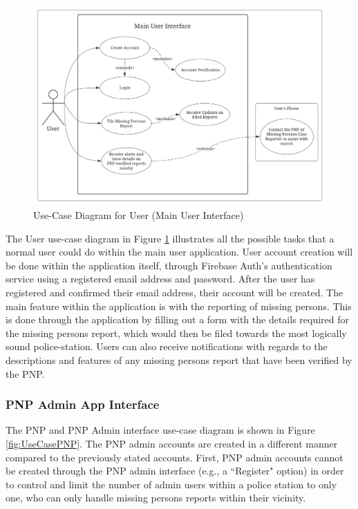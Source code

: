 \begin{figure}[!h]
    \centering
    \includegraphics[width=\textwidth]{figures/Chapter3/Chapt3_UseCase_Main.jpeg}
    \caption{Use-Case Diagram for User (Main User Interface)}
    \label{fig:UseCaseMain}
\end{figure}
The User use-case diagram in Figure \ref{fig:UseCaseMain} illustrates all the possible tasks that a normal user could do within the main user application. User account creation will be done within the application itself, through Firebase Auth’s authentication service using a registered email address and password. After the user has registered and confirmed their email address, their account will be created. The main feature within the application is with the reporting of missing persons. This is done through the application by filling out a form with the details required for the missing persons report, which would then be filed towards the most logically sound police-station. Users can also receive notifications with regards to the descriptions and features of any missing persons report that have been verified by the PNP.

\subsubsection{PNP Admin App Interface}

The PNP and PNP Admin interface use-case diagram is shown in Figure \ref{fig:UseCasePNP}. The PNP admin accounts are created in a different manner compared to the previously stated accounts. First, PNP admin accounts cannot be created through the PNP admin interface (e.g., a ``Register" option) in order to control and limit the number of admin users within a police station to only one, who can only handle missing persons reports within their vicinity. 


